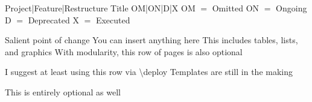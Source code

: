 \documentclass{article}
\begin{document}
\frontmatter
{Project|Feature|Restructure}
{Title}
{OM|ON|D|X}
{\hfill OM $=$ Omitted \hfill ON $=$ Ongoing \hfill D $=$ Deprecated \hfill X $=$ Executed}

\strategy
{Salient point of change}
{You can insert anything here}
{This includes tables, lists, and graphics}
{With modularity, this row of pages is also optional}

\deploy
{I suggest at least using this row via {\textbackslash}deploy}
{Templates are still in the making}

\report
{This is entirely optional as well}
\end{document}
